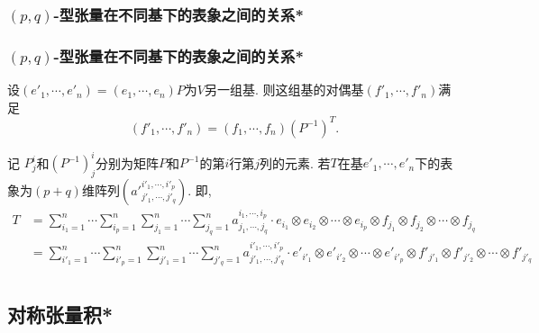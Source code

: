 \subsubsection{$(p,q)$-型张量在不同基下的表象之间的关系*}
\begin{frame}\frametitle{$(p,q)$-型张量在不同基下的表象之间的关系*}
设$(e'_1,\cdots,e'_n)=(e_1,\cdots,e_n)P$为$V$另一组基. 则这组基的对偶基$(f'_1,\cdots,f'_n)$满足
\[(f'_1,\cdots,f'_n)=(f_1,\cdots,f_n)(P^{-1})^T.\]

记 $P^i_j$和$(P^{-1})^i_j$分别为矩阵$P$和$P^{-1}$的第$i$行第$j$列的元素. 若$T$在基$e'_1,\cdots,e'_n$下的表象为$(p+q)$维阵列$({a'}^{i'_1,\cdots,i'_p}_{j'_1,\cdots,j'_q})$. 即,
\begin{equation*}
\begin{split}
T &= \sum_{i_1=1}^{n}\cdots\sum_{i_p=1}^{n} \sum_{j_1=1}^{n}\cdots\sum_{j_q=1}^{n} a^{i_1,\cdots,i_p}_{j_1,\cdots,j_q} \cdot e_{i_1}\otimes e_{i_2}\otimes \cdots \otimes e_{i_p}\otimes f_{j_1}\otimes f_{j_2}\otimes \cdots \otimes f_{j_q}\\
&= \sum_{i'_1=1}^{n}\cdots\sum_{i'_p=1}^{n} \sum_{j'_1=1}^{n}\cdots\sum_{j'_q=1}^{n} a^{i'_1,\cdots,i'_p}_{j'_1,\cdots,j'_q} \cdot e'_{i'_1}\otimes e'_{i'_2}\otimes \cdots \otimes e'_{i'_p}\otimes f'_{j'_1}\otimes f'_{j'_2}\otimes \cdots \otimes f'_{j'_q}\\
\end{split}
\end{equation*}
\pp
\begin{theorem}
\end{theorem}

\end{frame}





\subsection{对称张量积*}


